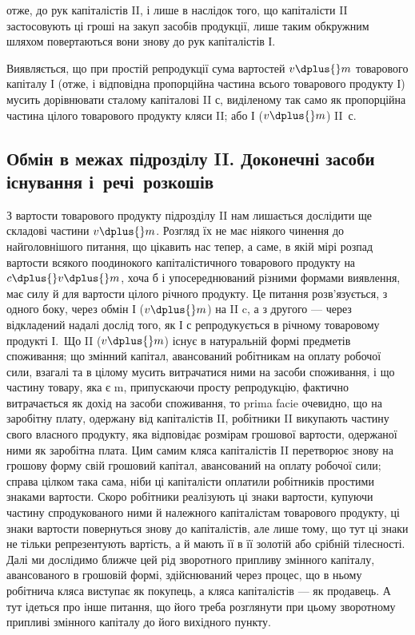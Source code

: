 \parcont{}  %
отже, до рук капіталістів II, і лише в наслідок того, що капіталісти II застосовують
ці гроші на закуп засобів продукції, лише таким обкружним
шляхом повертаються вони знову до рук капіталістів І.

Виявляється, що при простій репродукції сума вартостей $v \dplus{} m$ товарового
капіталу І (отже, і відповідна пропорційна частина всього товарового
продукту І) мусить дорівнювати сталому капіталові II $с$, виділеному
так само як пропорційна частина цілого товарового продукту кляси II;
або І ($v \dplus{} m$) \deq{} II~с.

\subsection{Обмін в межах підрозділу II. Доконечні засоби існування
 і~речі~розкошів}

З вартости товарового продукту підрозділу II нам лишається дослідити
ще складові частини $v \dplus{} m$. Розгляд їх не має ніякого чинення до
найголовнішого питання, що цікавить нас тепер, а саме, в якій мірі
розпад вартости всякого поодинокого капіталістичного товарового продукту
на $c \dplus{} v \dplus{} m$, хоча б і упосереднюваний різними формами виявлення,
має силу й для вартости цілого річного продукту. Це питання
розв’язується, з одного боку, через обмін І ($v \dplus{} m$) на II c, а з другого
— через відкладений надалі дослід того, як І с репродукується в
річному товаровому продукті І.~Що II ($v \dplus{} m$) існує в натуральній формі
предметів споживання; що змінний капітал, авансований робітникам на
оплату робочої сили, взагалі та в цілому мусить витрачатися ними на
засоби споживання, і що частину товару, яка є m, припускаючи просту
репродукцію, фактично витрачається як дохід на засоби споживання, то
prima facie очевидно, що на заробітну плату, одержану від капіталістів
II, робітники II викупають частину свого власного продукту, яка відповідає
розмірам грошової вартости, одержаної ними як заробітна плата. Цим
самим кляса капіталістів II перетворює знову на грошову форму свій
грошовий капітал, авансований на оплату робочої сили; справа цілком
така сама, ніби ці капіталісти оплатили робітників простими знаками вартости.
Скоро робітники реалізують ці знаки вартости, купуючи частину
спродукованого ними й належного капіталістам товарового продукту, ці
знаки вартости повернуться знову до капіталістів, але лише тому, що тут
ці знаки не тільки репрезентують вартість, а й мають її в її золотій
або срібній тілесності. Далі ми дослідимо ближче цей рід зворотного
припливу змінного капіталу, авансованого в грошовій формі, здійснюваний
через процес, що в ньому робітнича кляса виступає як покупець, а
кляса капіталістів — як продавець. А тут ідеться про інше питання,
що його треба розглянути при цьому зворотному припливі змінного
капіталу до його вихідного пункту.

